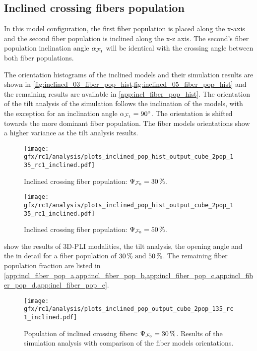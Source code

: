 \subsection{Inclined crossing fibers population}
\label{sec:resInclCross}
%
In this model configuration, the first fiber population \popa{} is placed along the x-axis and the second fiber population is inclined along the x-z axis.
The second's fiber population inclination angle $\textnormal{$\alpha$}_{\textnormal{$\mathcal{F}_1$}}$ will be identical with the crossing angle \modelOmega{} between both fiber populations.
\par
%
The orientation histograms of the inclined models and their simulation results are shown in \cref{fig:inclined_03_fiber_pop_hist,fig:inclined_05_fiber_pop_hist} and the remaining results are available in \cref{app:incl_fiber_pop_hist}.
The orientation of the tilt analysis of the simulation follows the inclination of the models, with the exception for an inclination angle $\textnormal{$\alpha$}_{\textnormal{$\mathcal{F}_1$}} = \SI{90}{\degree}$.
The orientation is shifted towards the more dominant fiber population.
The fiber models orientations show a higher variance as the tilt analysis results.
\par
%
\begin{figure}[!p]
\centering
\texttt{[image: gfx/rc1/analysis/plots\_inclined\_pop\_hist\_output\_cube\_2pop\_135\_rc1\_inclined.pdf]}
\caption[]{Inclined crossing fiber population: $\textnormal{$\Psi_{\textnormal{$\mathcal{F}_0$}}$}=\SI{30}{\percent}$.
}
\label{fig:inclined_03_fiber_pop_hist}
%
\vspace{2em}
\texttt{[image: gfx/rc1/analysis/plots\_inclined\_pop\_hist\_output\_cube\_2pop\_135\_rc1\_inclined.pdf]}
\caption[]{Inclined crossing fiber population: $\textnormal{$\Psi_{\textnormal{$\mathcal{F}_0$}}$}=\SI{50}{\percent}$.
}
\label{fig:inclined_05_fiber_pop_hist}
\end{figure}
%
 show the results of \ac{3D-PLI} modalities, the tilt analysis, the opening angle and the \accvalue{} in detail for a fiber population of $\SIlist{30;50}{\percent}$.%
The remaining fiber population fraction are listed in \cref{app:incl_fiber_pop_a,app:incl_fiber_pop_b,app:incl_fiber_pop_c,app:incl_fiber_pop_d,app:incl_fiber_pop_e}.
\par
%
\begin{figure}[!p]
    \centering
    \texttt{[image: gfx/rc1/analysis/plots\_inclined\_pop\_output\_cube\_2pop\_135\_rc1\_inclined.pdf]}
    \caption[]{Population of inclined crossing fibers: $\textnormal{$\Psi_{\textnormal{$\mathcal{F}_0$}}$}=\SI{30}{\percent}$. Results of the simulation analysis with comparison of the fiber models orientations.}
    \label{fig:inclined_03_fiber_pop_rofl}
    \end{figure}
